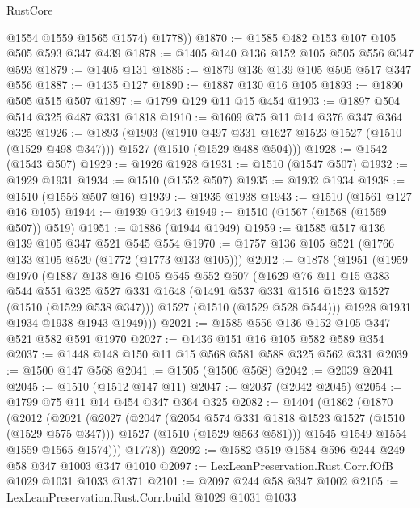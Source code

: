 \begin{lexlean}{RustCore}
\begin{coremodule}
          @1554
          @1559
          @1565
          @1574)
        @1778))
@1870 := @1585 @482 @153 @107 @105 @505 @593 @347 @439
@1878 := @1405 @140 @136 @152 @105 @505 @556 @347 @593
@1879 := @1405 @131
@1886 := @1879 @136 @139 @105 @505 @517 @347 @556
@1887 := @1435 @127
@1890 := @1887 @130 @16 @105
@1893 := @1890 @505 @515 @507
@1897 := @1799 @129 @11 @15 @454
@1903 := @1897 @504 @514 @325 @487 @331 @1818
@1910 := @1609 @75 @11 @14 @376 @347 @364 @325
@1926 := @1893
    (@1903
      (@1910 @497 @331 @1627 @1523 @1527 (@1510 (@1529 @498 @347)))
      @1527
      (@1510 (@1529 @488 @504)))
@1928 := @1542 (@1543 @507)
@1929 := @1926 @1928
@1931 := @1510 (@1547 @507)
@1932 := @1929 @1931
@1934 := @1510 (@1552 @507)
@1935 := @1932 @1934
@1938 := @1510 (@1556 @507 @16)
@1939 := @1935 @1938
@1943 := @1510 (@1561 @127 @16 @105)
@1944 := @1939 @1943
@1949 := @1510 (@1567 (@1568 (@1569 @507)) @519)
@1951 := @1886 (@1944 @1949)
@1959 := @1585 @517 @136 @139 @105 @347 @521 @545 @554
@1970 := @1757 @136 @105 @521 (@1766 @133 @105 @520 (@1772 (@1773 @133 @105)))
@2012 := @1878
    (@1951
      (@1959
        @1970
        (@1887
          @138
          @16
          @105
          @545
          @552
          @507
          (@1629
            @76
            @11
            @15
            @383
            @544
            @551
            @325
            @527
            @331
            @1648
            (@1491 @537 @331 @1516 @1523 @1527 (@1510 (@1529 @538 @347)))
            @1527
            (@1510 (@1529 @528 @544)))
          @1928
          @1931
          @1934
          @1938
          @1943
          @1949)))
@2021 := @1585 @556 @136 @152 @105 @347 @521 @582 @591 @1970
@2027 := @1436 @151 @16 @105 @582 @589 @354
@2037 := @1448 @148 @150 @11 @15 @568 @581 @588 @325 @562 @331
@2039 := @1500 @147 @568
@2041 := @1505 (@1506 @568)
@2042 := @2039 @2041
@2045 := @1510 (@1512 @147 @11)
@2047 := @2037 (@2042 @2045)
@2054 := @1799 @75 @11 @14 @454 @347 @364 @325
@2082 := @1404
    (@1862
      (@1870
        (@2012
          (@2021
            (@2027
              (@2047
                (@2054 @574 @331 @1818 @1523 @1527 (@1510 (@1529 @575 @347)))
                @1527
                (@1510 (@1529 @563 @581)))
              @1545
              @1549
              @1554
              @1559
              @1565
              @1574)))
        @1778))
@2092 := @1582 @519 @1584 @596 @244 @249 @58 @347 @1003 @347 @1010
@2097 := LexLeanPreservation.Rust.Corr.fOfB @1029 @1031 @1033 @1371
@2101 := @2097 @244 @58 @347 @1002
@2105 := LexLeanPreservation.Rust.Corr.build @1029 @1031 @1033

\end{coremodule}
\end{lexlean}
